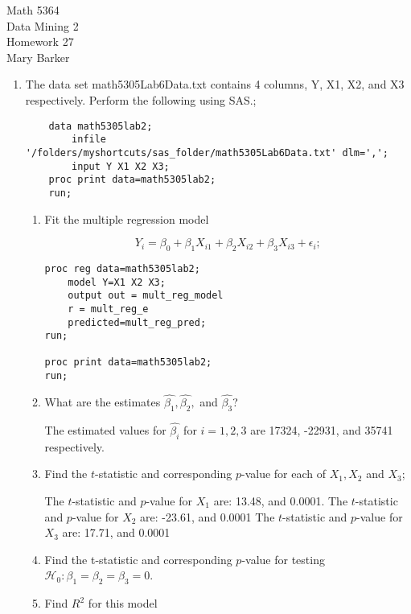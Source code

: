 \documentclass[11pt]{article}
\begin{document}
\noindent\large{Math 5364}\\
\large{Data Mining 2}\\
\large{Homework 27}\\
\large{Mary Barker}

\begin{enumerate}
\item 
 The data set math5305Lab6Data.txt 
	contains 4 columns, Y, X1, X2, and 
	X3 respectively. Perform the 
	following using SAS.;

\begin{Verbatim}
	data math5305lab2;
	    infile '/folders/myshortcuts/sas_folder/math5305Lab6Data.txt' dlm=',';
	    input Y X1 X2 X3;
	proc print data=math5305lab2;
	run;
\end{Verbatim}

	\begin{enumerate}
		\item
		Fit the multiple regression model 
	
\begin{equation*}
Y_i = \beta_0 + \beta_1 X_{i1} + \beta_2 X_{i2} + \beta_3 X_{i3} + \epsilon_i;
\end{equation*}

\begin{Verbatim}
proc reg data=math5305lab2;
    model Y=X1 X2 X3;
    output out = mult_reg_model
    r = mult_reg_e
    predicted=mult_reg_pred;
run;

proc print data=math5305lab2;
run;
\end{Verbatim}

		\item 
		 What are the estimates 
			$\hat{\beta_1}, \hat{\beta_2},$ and $\hat{\beta_3}$?

			The estimated values for $\hat{\beta_i}$ for $i = 1, 2, 3$ are 
			17324, -22931, and 35741 respectively. 
		\item 
		Find the $t$-statistic and corresponding $p$-value for each of $X_1, X_2$ and $X_3$;

		The $t$-statistic and $p$-value for $X_1$ are: 13.48, and 0.0001.
		The $t$-statistic and $p$-value for $X_2$ are: -23.61, and 0.0001
		The $t$-statistic and $p$-value for $X_3$ are: 17.71, and 0.0001

		\item 
		Find the t-statistic and corresponding $p$-value for testing $\mathcal{H}_0: \beta_1 = \beta_2 = \beta_3 = 0$.

		\item 
		Find $R^2$ for this model


\end{enumerate}
\end{enumerate}
\end{document}
